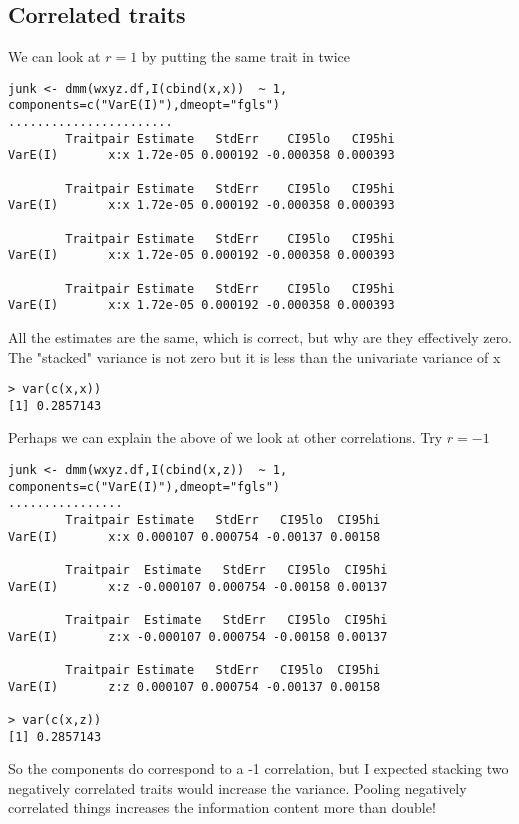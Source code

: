 \documentclass{report}  %
\begin{document}
\subsection{Correlated traits}
We can look at $r=1$ by putting the same trait in twice
\begin{verbatim}
junk <- dmm(wxyz.df,I(cbind(x,x))  ~ 1, components=c("VarE(I)"),dmeopt="fgls")
.......................
        Traitpair Estimate   StdErr    CI95lo   CI95hi
VarE(I)       x:x 1.72e-05 0.000192 -0.000358 0.000393

        Traitpair Estimate   StdErr    CI95lo   CI95hi
VarE(I)       x:x 1.72e-05 0.000192 -0.000358 0.000393

        Traitpair Estimate   StdErr    CI95lo   CI95hi
VarE(I)       x:x 1.72e-05 0.000192 -0.000358 0.000393

        Traitpair Estimate   StdErr    CI95lo   CI95hi
VarE(I)       x:x 1.72e-05 0.000192 -0.000358 0.000393
\end{verbatim}
All the estimates are the same, which is correct, but why are they effectively zero. The "stacked" variance is not zero but it is less than the univariate variance of x
\begin{verbatim}
> var(c(x,x))
[1] 0.2857143
\end{verbatim}

Perhaps we can explain the above of we look at other correlations. Try $r=-1$
\begin{verbatim}
junk <- dmm(wxyz.df,I(cbind(x,z))  ~ 1, components=c("VarE(I)"),dmeopt="fgls")
................
        Traitpair Estimate   StdErr   CI95lo  CI95hi
VarE(I)       x:x 0.000107 0.000754 -0.00137 0.00158

        Traitpair  Estimate   StdErr   CI95lo  CI95hi
VarE(I)       x:z -0.000107 0.000754 -0.00158 0.00137

        Traitpair  Estimate   StdErr   CI95lo  CI95hi
VarE(I)       z:x -0.000107 0.000754 -0.00158 0.00137

        Traitpair Estimate   StdErr   CI95lo  CI95hi
VarE(I)       z:z 0.000107 0.000754 -0.00137 0.00158

> var(c(x,z))
[1] 0.2857143
\end{verbatim}
 So the components do correspond to a -1 correlation, but I expected stacking two negatively correlated traits would increase the variance. Pooling negatively correlated things increases the information content more than double!
\end{document}

